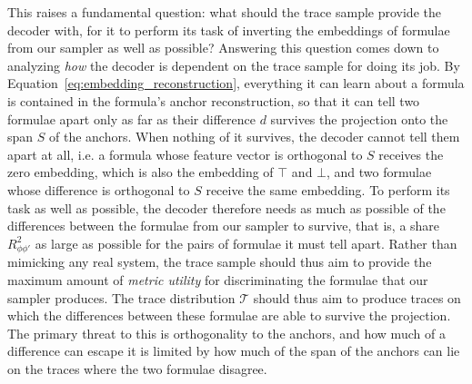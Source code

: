 \documentclass[titlepage,a4paper,11pt]{report}
\begin{document}
    This raises a fundamental question: what should the trace sample provide the decoder with, for it to perform its task of inverting the embeddings of formulae from our sampler as well as possible? Answering this question comes down to analyzing \emph{how} the decoder is dependent on the trace sample for doing its job. By Equation~\eqref{eq:embedding_reconstruction}, everything it can learn about a formula is contained in the formula's anchor reconstruction, so that it can tell two formulae apart only as far as their difference $d$ survives the projection onto the span $S$ of the anchors. When nothing of it survives, the decoder cannot tell them apart at all, i.e. a formula whose feature vector is orthogonal to $S$ receives the zero embedding, which is also the embedding of $\top$ and $\bot$, and two formulae whose difference is orthogonal to $S$ receive the same embedding. To perform its task as well as possible, the decoder therefore needs as much as possible of the differences between the formulae from our sampler to survive, that is, a share $R^2_{\phi\phi'}$ as large as possible for the pairs of formulae it must tell apart. Rather than mimicking any real system, the trace sample should thus aim to provide the maximum amount of \emph{metric utility} for discriminating the formulae that our sampler produces. The trace distribution $\mathcal{T}$ should thus aim to produce traces on which the differences between these formulae are able to survive the projection. The primary threat to this is orthogonality to the anchors, and how much of a difference can escape it is limited by how much of the span of the anchors can lie on the traces where the two formulae disagree.
 
\end{document}
